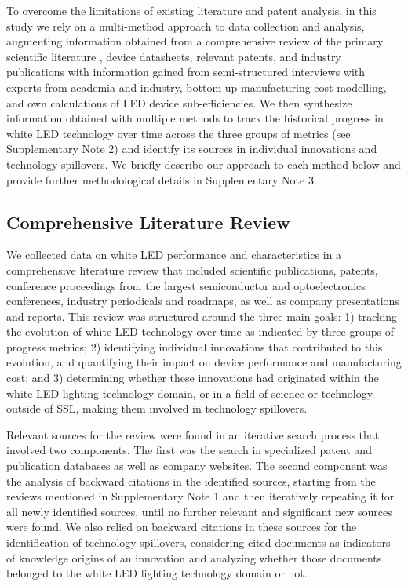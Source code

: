 \documentclass[parskip=full]{article}
\begin{document}
To overcome the limitations of existing literature and patent analysis, in this study we rely on a multi-method approach to data collection and analysis, augmenting information obtained from a comprehensive review of the primary scientific literature \cite{Haddaway_2014}, device datasheets, relevant patents, and industry publications with information gained from semi-structured interviews with experts from academia and industry, bottom-up manufacturing cost modelling, and own calculations of LED device sub-efficiencies. We then synthesize information obtained with multiple methods to track the historical progress in white LED technology over time across the three groups of metrics (see Supplementary Note 2) and identify its sources in individual innovations and technology spillovers. We briefly describe our approach to each method below and provide further methodological details in Supplementary Note 3. 

\subsection{Comprehensive Literature Review}

We collected data on white LED performance and characteristics in a comprehensive literature review that included scientific publications, patents, conference proceedings from the largest semiconductor and optoelectronics conferences, industry periodicals and roadmaps, as well as company presentations and reports. This review was structured around the three main goals: 1) tracking the evolution of white LED technology over time as indicated by three groups of progress metrics; 2) identifying individual innovations that contributed to this evolution, and quantifying their impact on device performance and manufacturing cost; and 3) determining whether these innovations had originated within the white LED lighting technology domain, or in a field of science or technology outside of SSL, making them involved in technology spillovers.

Relevant sources for the review were found in an iterative search process that involved two components. The first was the search in specialized patent and publication databases as well as company websites. The second component was the analysis of backward citations in the identified sources, starting from the reviews mentioned in Supplementary Note 1 and then iteratively repeating it for all newly identified sources, until no further relevant and significant new sources were found. We also relied on backward citations in these sources for the identification of technology spillovers, considering cited documents as indicators of knowledge origins of an innovation and analyzing whether those documents belonged to the white LED lighting technology domain or not.
\end{document}
